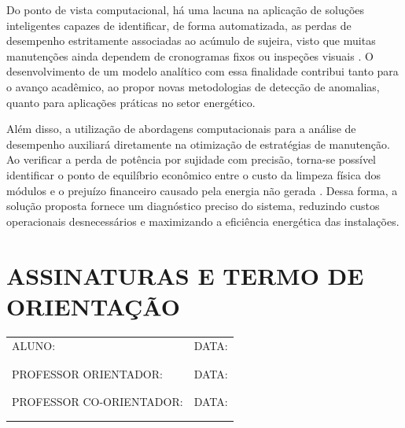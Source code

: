 \documentclass{UNESC}
\begin{document}
Do ponto de vista computacional, há uma lacuna na aplicação de soluções inteligentes capazes de identificar, de forma automatizada, as perdas de desempenho estritamente associadas ao acúmulo de sujeira, visto que muitas manutenções ainda dependem de cronogramas fixos ou inspeções visuais \cite{Tramontin_Rampinelli_2024}. O desenvolvimento de um modelo analítico com essa finalidade contribui tanto para o avanço acadêmico, ao propor novas metodologias de detecção de anomalias, quanto para aplicações práticas no setor energético.

Além disso, a utilização de abordagens computacionais para a análise de desempenho auxiliará diretamente na otimização de estratégias de manutenção. Ao verificar a perda de potência por sujidade com precisão, torna-se possível identificar o ponto de equilíbrio econômico entre o custo da limpeza física dos módulos e o prejuízo financeiro causado pela energia não gerada \cite{Araujo_Marques}. Dessa forma, a solução proposta fornece um diagnóstico preciso do sistema, reduzindo custos operacionais desnecessários e maximizando a eficiência energética das instalações.


\section{\small ASSINATURAS E TERMO DE ORIENTAÇÃO}

\noindent\begin{tabular}{ | m{25em}  | m{2.5cm} | } 
  \hline
  ALUNO: &DATA: \\
  & \\ 
  & \\ 
  \hline
  PROFESSOR ORIENTADOR:&DATA:  \\
  & \\ 
  & \\ 
  \hline
  PROFESSOR CO-ORIENTADOR: &DATA:\\
  & \\ 
  & \\ 
  \hline
\end{tabular}



\renewcommand{\refname}{REFERÊNCIAS}
\end{document}
